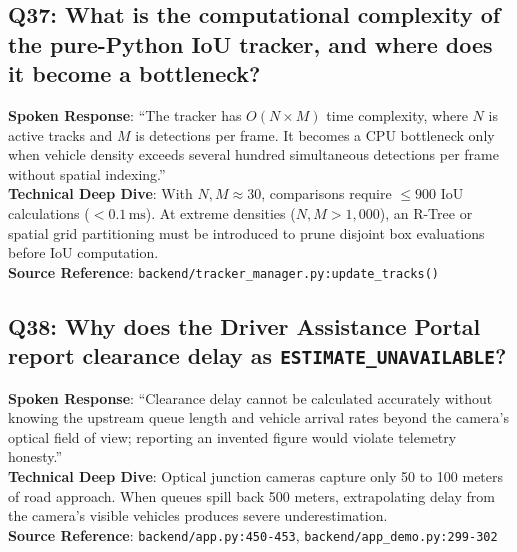 \documentclass[11pt,a4paper,oneside]{report}
\begin{document}
\subsection*{Q37: What is the computational complexity of the pure-Python IoU tracker, and where does it become a bottleneck?}
\begin{interviewbox}
\textbf{Spoken Response}: ``The tracker has $O(N \times M)$ time complexity, where $N$ is active tracks and $M$ is detections per frame. It becomes a CPU bottleneck only when vehicle density exceeds several hundred simultaneous detections per frame without spatial indexing.''\\
\textbf{Technical Deep Dive}: With $N, M \approx 30$, comparisons require $\le 900$ IoU calculations ($< 0.1\,\text{ms}$). At extreme densities ($N, M > 1,000$), an R-Tree or spatial grid partitioning must be introduced to prune disjoint box evaluations before IoU computation.\\
\textbf{Source Reference}: \texttt{backend/tracker\_manager.py:update\_tracks()}
\end{interviewbox}

\subsection*{Q38: Why does the Driver Assistance Portal report clearance delay as \texttt{ESTIMATE\_UNAVAILABLE}?}
\begin{interviewbox}
\textbf{Spoken Response}: ``Clearance delay cannot be calculated accurately without knowing the upstream queue length and vehicle arrival rates beyond the camera's optical field of view; reporting an invented figure would violate telemetry honesty.''\\
\textbf{Technical Deep Dive}: Optical junction cameras capture only 50 to 100 meters of road approach. When queues spill back 500 meters, extrapolating delay from the camera's visible vehicles produces severe underestimation.\\
\textbf{Source Reference}: \texttt{backend/app.py:450-453}, \texttt{backend/app\_demo.py:299-302}
\end{interviewbox}
\end{document}

